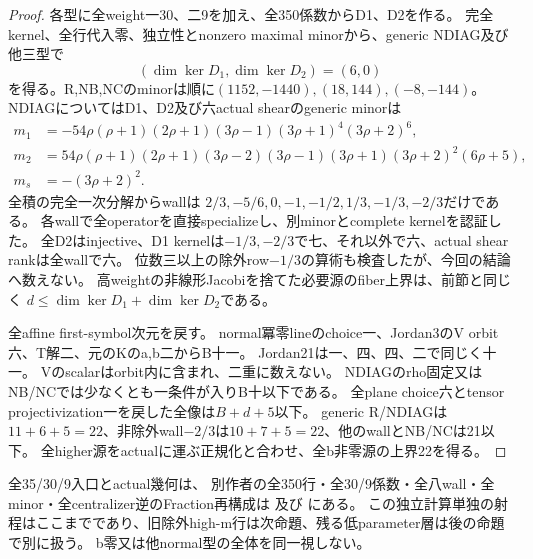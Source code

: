 \documentclass[a4paper,11pt]{ltjsarticle}
\theoremstyle{definition}
\begin{document}
\begin{proof}
各型に全weight一30、二9を加え、全350係数からD1、D2を作る。
完全kernel、全行代入零、独立性とnonzero maximal minorから、generic NDIAG及び他三型で
\[
 (\dim\ker D_1,\dim\ker D_2)=(6,0)
\]
を得る。R,NB,NCのminorは順に$(1152,-1440),(18,144),(-8,-144)$。
NDIAGについてはD1、D2及び六actual shearのgeneric minorは
\[
\begin{aligned}
 m_1&=-54\rho(\rho+1)(2\rho+1)(3\rho-1)(3\rho+1)^4(3\rho+2)^6,\\
 m_2&=54\rho(\rho+1)(2\rho+1)(3\rho-2)(3\rho-1)(3\rho+1)(3\rho+2)^2(6\rho+5),\\
 m_s&=-(3\rho+2)^2.
\end{aligned}
\]
全積の完全一次分解からwallは
$2/3,-5/6,0,-1,-1/2,1/3,-1/3,-2/3$だけである。
各wallで全operatorを直接specializeし、別minorとcomplete kernelを認証した。
全D2はinjective、D1 kernelは$-1/3,-2/3$で七、それ以外で六、actual shear rankは全wallで六。
位数三以上の除外row$-1/3$の算術も検査したが、今回の結論へ数えない。
高weightの非線形Jacobiを捨てた必要源のfiber上界は、前節と同じく
$d\le\dim\ker D_1+\dim\ker D_2$である。

全affine first-symbol次元を戻す。
normal冪零lineのchoice一、Jordan3のV orbit六、T解二、元のKのa,b二からB十一。
Jordan21は一、四、四、二で同じく十一。
Vのscalarはorbit内に含まれ、二重に数えない。
NDIAGのrho固定又はNB/NCでは少なくとも一条件が入りB十以下である。
全plane choice六とtensor projectivization一を戻した全像は$B+d+5$以下。
generic R/NDIAGは$11+6+5=22$、非除外wall$-2/3$は$10+7+5=22$、他のwallとNB/NCは21以下。
全higher源をactualに運ぶ正規化と合わせ、全b非零源の上界22を得る。
\end{proof}
全35/30/9入口とactual幾何は、
別作者の全350行・全30/9係数・全八wall・全minor・全centralizer逆のFraction再構成は
及び
にある。
この独立計算単独の射程はここまでであり、旧除外high-m行は次命題、残る低parameter層は後の命題で別に扱う。
b零又は他normal型の全体を同一視しない。
\end{document}
